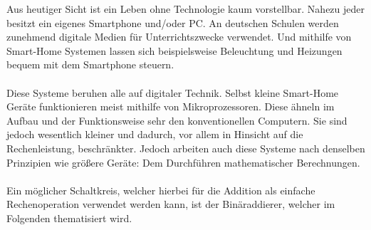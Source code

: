Aus heutiger Sicht ist ein Leben ohne Technologie kaum vorstellbar. Nahezu jeder besitzt ein eigenes Smartphone und/oder PC. An deutschen Schulen werden zunehmend digitale Medien für Unterrichtszwecke verwendet. Und mithilfe von \glqq{}Smart-Home\grqq{} Systemen lassen sich beispielsweise Beleuchtung und Heizungen bequem mit dem Smartphone steuern.\\\\
Diese Systeme beruhen alle auf digitaler Technik. Selbst kleine Smart-Home Geräte funktionieren meist mithilfe von Mikroprozessoren. Diese ähneln im Aufbau und der Funktionsweise sehr den konventionellen Computern. Sie sind jedoch wesentlich kleiner und dadurch, vor allem in Hinsicht auf die Rechenleistung, beschränkter. Jedoch arbeiten auch diese Systeme nach denselben Prinzipien wie größere Geräte: Dem Durchführen mathematischer Berechnungen.\\\\
Ein möglicher Schaltkreis, welcher hierbei für die Addition als einfache Rechenoperation verwendet werden kann, ist der \glqq{}Binäraddierer\grqq{}, welcher im Folgenden thematisiert wird.
